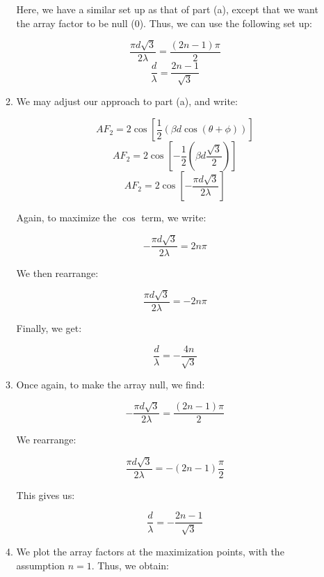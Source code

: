 \begin{enumerate}
\begin{enumerate}
        Here, we have a similar set up as that of part (a), except that we want the array factor to be null (0). Thus, we can use the following set up:

        $$\frac{\pi d\sqrt{3}}{2\lambda}=\frac{(2n-1)\pi}{2}$$
        $$\boxed{\frac{d}{\lambda}=\frac{2n-1}{\sqrt{3}}}$$

      \item 

        We may adjust our approach to part (a), and write:

        $$AF_2=2\cos\left[ \frac{1}{2}\left( \beta d\cos(\theta+\phi) \right) \right]$$
        $$AF_2=2\cos\left[ -\frac{1}{2}\left( \beta d\frac{\sqrt{3}}{2} \right) \right]$$
        $$AF_2=2\cos\left[ -\frac{\pi d\sqrt{3}}{2\lambda} \right]$$

        Again, to maximize the $\cos$ term, we write:

        $$-\frac{\pi d\sqrt{3}}{2\lambda}=2n\pi$$

        We then rearrange:

        $$\frac{\pi d\sqrt{3}}{2\lambda}=-2n\pi$$

        Finally, we get:

        $$\boxed{\frac{d}{\lambda}=-\frac{4n}{\sqrt{3}}}$$

      \item 

        Once again, to make the array null, we find:

        $$-\frac{\pi d\sqrt{3}}{2\lambda}=\frac{(2n-1)\pi}{2}$$

        We rearrange:

        $$\frac{\pi d\sqrt{3}}{2\lambda}=-\left( 2n-1\right)\frac{\pi}{2}$$

        This gives us:

        $$\boxed{\frac{d}{\lambda}=-\frac{2n-1}{\sqrt{3}}}$$

    \newpage

      \item 

        We plot the array factors at the maximization points, with the assumption $n=1$. Thus, we obtain:


\end{enumerate}
\end{enumerate}
